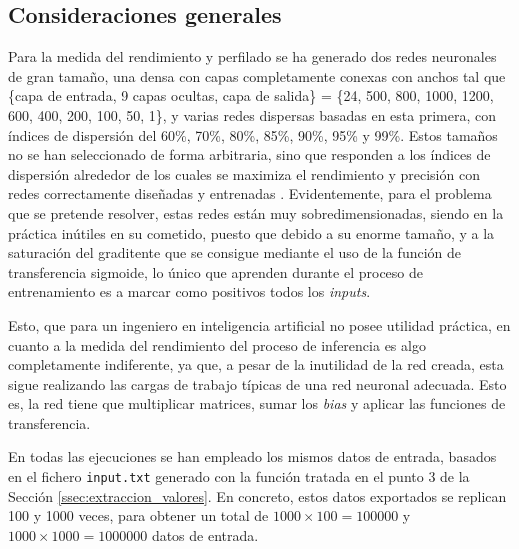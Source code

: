 \subsection{Consideraciones generales}
\label{ssec:consideraciones_generales}
Para la medida del rendimiento y perfilado se ha generado dos redes neuronales de gran tamaño, una densa con capas completamente conexas con anchos tal que \{capa de entrada, 9 capas ocultas, capa de salida\} = \{24, 500, 800, 1000, 1200, 600, 400, 200, 100, 50, 1\}, y varias redes dispersas basadas en esta primera, con índices de dispersión del 60\%, 70\%, 80\%, 85\%, 90\%, 95\% y 99\%. Estos tamaños no se han seleccionado de forma arbitraria, sino que responden a los índices de dispersión alrededor de los cuales se maximiza el rendimiento y precisión con redes correctamente diseñadas y entrenadas \cite[Figura 4]{hoefler2102sparsity}. Evidentemente, para el problema que se pretende resolver, estas redes están muy sobredimensionadas, siendo en la práctica inútiles en su cometido, puesto que debido a su enorme tamaño, y a la saturación del graditente que se consigue mediante el uso de la función de transferencia sigmoide, lo único que aprenden durante el proceso de entrenamiento es a marcar como positivos todos los \textit{inputs}.

Esto, que para un ingeniero en inteligencia artificial no posee utilidad práctica, en cuanto a la medida del rendimiento del proceso de inferencia es algo completamente indiferente, ya que, a pesar de la inutilidad de la red creada, esta sigue realizando las cargas de trabajo típicas de una red neuronal adecuada. Esto es, la red tiene que multiplicar matrices, sumar los \textit{bias} y aplicar las funciones de transferencia.

En todas las ejecuciones se han empleado los mismos datos de entrada, basados en el fichero \texttt{input.txt} generado con la función tratada en el punto 3 de la Sección \ref{ssec:extraccion_valores}. En concreto, estos datos exportados se replican 100 y 1000 veces, para obtener un total de $1000 \times 100 = 100000$ y $1000 \times 1000 = 1000000$ datos de entrada.

